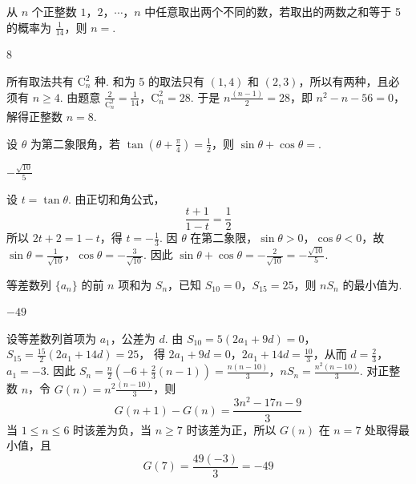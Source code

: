 \begin{problem}
从 \(n\) 个正整数 \(1\)，\(2\)，\(\cdots\)，\(n\) 中任意取出两个不同的数，若取出的两数之和等于 5 的概率为 \(\frac{1}{14}\)，则 \(n =\)\fillinblank{}.
\end{problem}

\begin{answer}
\(8\)
\end{answer}

\begin{solution}
所有取法共有 \(\mathrm C_n^2\) 种. 和为 5 的取法只有 \((1,4)\) 和 \((2,3)\)，所以有两种，且必须有 \(n\geqslant4\). 由题意
\(\frac{2}{\mathrm C_n^2}=\frac1{14}\)，\(\mathrm C_n^2=28\).
于是 \(n\frac{(n-1)}{2}=28\)，即 \(n^2-n-56=0\)，解得正整数 \(n=8\).
\end{solution}

\begin{problem}
设 \(\theta\) 为第二象限角，若 \(\tan \left( \theta + \frac{\pi}{4} \right) = \frac{1}{2}\)，则 \(\sin \theta + \cos \theta =\)\fillinblank{}.
\end{problem}

\begin{answer}
\(-\frac{\sqrt{10}}{5}\)
\end{answer}

\begin{solution}
设 \(t=\tan\theta\). 由正切和角公式，
\[
\frac{t+1}{1-t}=\frac12
\]
所以 \(2t+2=1-t\)，得 \(t=-\frac13\). 因 \(\theta\) 在第二象限，\(\sin\theta>0\)，\(\cos\theta<0\)，故
\(\sin\theta=\frac1{\sqrt{10}}\)，\(\cos\theta=-\frac3{\sqrt{10}}\).
因此 \(\sin\theta+\cos\theta=-\frac2{\sqrt{10}}=-\frac{\sqrt{10}}5\).
\end{solution}

\begin{problem}
等差数列 \(\{a_n\}\) 的前 \(n\) 项和为 \(S_n\)，已知 \(S_{10} = 0\)，\(S_{15} = 25\)，则 \(nS_n\) 的最小值为\fillinblank{}.
\end{problem}

\begin{answer}
\(-49\)
\end{answer}

\begin{solution}
设等差数列首项为 \(a_1\)，公差为 \(d\). 由
\(S_{10}=5(2a_1+9d)=0\)，\(S_{15}=\frac{15}{2}(2a_1+14d)=25\)，
得 \(2a_1+9d=0\)，\(2a_1+14d=\frac{10}{3}\)，从而 \(d=\frac23\)，\(a_1=-3\). 因此
\(S_n=\frac n2\left(-6+\frac23(n-1)\right)=\frac{n(n-10)}3\)，\(nS_n=\frac{n^2(n-10)}3\).
对正整数 \(n\)，令 \(G(n)=n^2\frac{(n-10)}{3}\)，则
\[
G(n+1)-G(n)=\frac{3n^2-17n-9}{3}
\]
当 \(1\leqslant n\leqslant6\) 时该差为负，当 \(n\geqslant7\) 时该差为正，所以 \(G(n)\) 在 \(n=7\) 处取得最小值，且
\[
G(7)=\frac{49(-3)}3=-49
\]
\end{solution}

